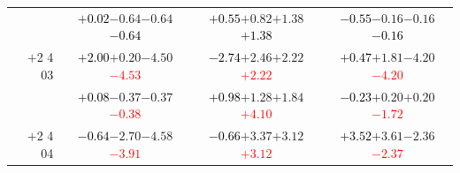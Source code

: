 \documentclass[compress]{beamer}
\begin{document}
\begin{frame}
\begin{tabular}{r | c | c | c}
          & \textcolor{black}{$+0.02$}\hspace{0.1 cm}$-0.64$\hspace{0.1 cm}$-0.64$\hspace{0.1 cm}\textcolor{black}{$-0.64$} & \textcolor{black}{$+0.55$}\hspace{0.1 cm}$+0.82$\hspace{0.1 cm}$+1.38$\hspace{0.1 cm}\textcolor{black}{$+1.38$} & \textcolor{black}{$-0.55$}\hspace{0.1 cm}$-0.16$\hspace{0.1 cm}$-0.16$\hspace{0.1 cm}\textcolor{black}{$-0.16$} \\
$+$2 4 03 & \textcolor{black}{$+2.00$}\hspace{0.1 cm}$+0.20$\hspace{0.1 cm}$-4.50$\hspace{0.1 cm}\textcolor{red}{$-4.53$} & \textcolor{black}{$-2.74$}\hspace{0.1 cm}$+2.46$\hspace{0.1 cm}$+2.22$\hspace{0.1 cm}\textcolor{red}{$+2.22$} & \textcolor{black}{$+0.47$}\hspace{0.1 cm}$+1.81$\hspace{0.1 cm}$-4.20$\hspace{0.1 cm}\textcolor{red}{$-4.20$} \\
          & \textcolor{black}{$+0.08$}\hspace{0.1 cm}$-0.37$\hspace{0.1 cm}$-0.37$\hspace{0.1 cm}\textcolor{red}{$-0.38$} & \textcolor{black}{$+0.98$}\hspace{0.1 cm}$+1.28$\hspace{0.1 cm}$+1.84$\hspace{0.1 cm}\textcolor{red}{$+4.10$} & \textcolor{black}{$-0.23$}\hspace{0.1 cm}$+0.20$\hspace{0.1 cm}$+0.20$\hspace{0.1 cm}\textcolor{red}{$-1.72$} \\
$+$2 4 04 & \textcolor{black}{$-0.64$}\hspace{0.1 cm}$-2.70$\hspace{0.1 cm}$-4.58$\hspace{0.1 cm}\textcolor{red}{$-3.91$} & \textcolor{black}{$-0.66$}\hspace{0.1 cm}$+3.37$\hspace{0.1 cm}$+3.12$\hspace{0.1 cm}\textcolor{red}{$+3.12$} & \textcolor{black}{$+3.52$}\hspace{0.1 cm}$+3.61$\hspace{0.1 cm}$-2.36$\hspace{0.1 cm}\textcolor{red}{$-2.37$} \\

\end{tabular}
\end{frame}
\end{document}
